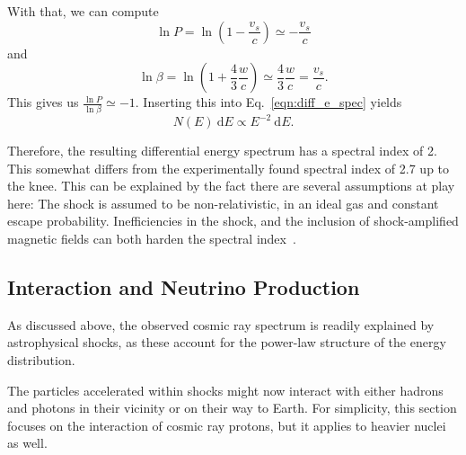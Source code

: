 With that, we can compute
\begin{equation}
    \ln P = \ln ( 1-\frac{v_s}{c}) \simeq -\frac{v_s}{c}
\end{equation}
and
\begin{equation}
    \ln \beta = \ln(1+\frac{4}{3}\frac{w}{c}) \simeq \frac{4}{3}\frac{w}{c} = \frac{v_s}{c}.
\end{equation}
This gives us $\frac{\ln P}{\ln \beta} \simeq -1$. Inserting this into Eq.~\ref{eqn:diff_e_spec} yields
\begin{equation}
    N(E)~\text{d} E \propto E^{-2}~\text{d} E.
\end{equation}

Therefore, the resulting differential energy spectrum has a spectral index of 2. This somewhat differs from the experimentally found spectral index of 2.7 up to the knee. This can be explained by the fact there are several assumptions at play here: The shock is assumed to be non-relativistic, in an ideal gas and constant escape probability. Inefficiencies in the shock, and the inclusion of shock-amplified magnetic fields can both harden the spectral index~\cite{Spurio2018}.

\subsection{Interaction and Neutrino Production}\label{cr_interactions}
As discussed above, the observed cosmic ray spectrum is readily explained by astrophysical shocks, as these account for the power-law structure of the energy distribution.

The particles accelerated within shocks might now interact with either hadrons and photons in their vicinity or on their way to Earth. For simplicity, this section focuses on the interaction of cosmic ray protons, but it applies to heavier nuclei as well.

